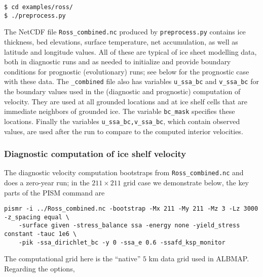 \begin{verbatim}
$ cd examples/ross/
$ ./preprocess.py
\end{verbatim}

The NetCDF file \texttt{Ross_combined.nc} produced by \texttt{preprocess.py} contains ice thickness, bed elevations, surface temperature, net accumulation, as well as latitude and longitude values.  All of these are typical of ice sheet modelling data, both in diagnostic runs and as needed to initialize and provide boundary conditions for prognostic (evolutionary) runs; see below for the prognostic case with these data.  The \texttt{_combined} file also has variables \texttt{u_ssa_bc} and \texttt{v_ssa_bc} for the boundary values used in the (diagnostic and prognostic) computation of velocity.  They are used at all grounded locations and at ice shelf cells that are immediate neighbors of grounded ice.  The variable \texttt{bc_mask} specifies these locations.  Finally the variables \texttt{u_ssa_bc,v_ssa_bc}, which contain observed values, are used after the run to compare to the computed interior velocities.

\subsubsection*{Diagnostic computation of ice shelf velocity}  The diagnostic velocity computation bootstraps from \texttt{Ross_combined.nc} and does a zero-year run; in the $211\times 211$ grid case we demonstrate below, the key parts of the PISM command are

\begin{verbatim}
pismr -i ../Ross_combined.nc -bootstrap -Mx 211 -My 211 -Mz 3 -Lz 3000 -z_spacing equal \
    -surface given -stress_balance ssa -energy none -yield_stress constant -tauc 1e6 \
    -pik -ssa_dirichlet_bc -y 0 -ssa_e 0.6 -ssafd_ksp_monitor
\end{verbatim}

\noindent The computational grid here is the ``native'' $5$ km data grid used in ALBMAP.  Regarding the options,

